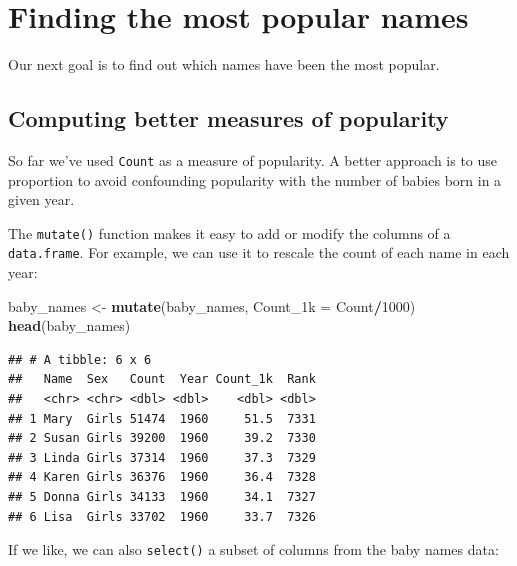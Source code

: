 \documentclass[]{book}
\newenvironment{Shaded}{\begin{snugshade}}{\end{snugshade}}
\newcommand{\DataTypeTok}[1]{\textcolor[rgb]{0.13,0.29,0.53}{#1}}
\newcommand{\DecValTok}[1]{\textcolor[rgb]{0.00,0.00,0.81}{#1}}
\newcommand{\KeywordTok}[1]{\textcolor[rgb]{0.13,0.29,0.53}{\textbf{#1}}}
\newcommand{\NormalTok}[1]{#1}
\newcommand{\OperatorTok}[1]{\textcolor[rgb]{0.81,0.36,0.00}{\textbf{#1}}}
\newcommand{\StringTok}[1]{\textcolor[rgb]{0.31,0.60,0.02}{#1}}
\begin{document}
\hypertarget{finding-the-most-popular-names}{%
\section{Finding the most popular names}\label{finding-the-most-popular-names}}

Our next goal is to find out which names have been the most popular.

\hypertarget{computing-better-measures-of-popularity}{%
\subsection{Computing better measures of popularity}\label{computing-better-measures-of-popularity}}

So far we've used \texttt{Count} as a measure of popularity. A better
approach is to use proportion to avoid confounding
popularity with the number of babies born in a given year.

The \texttt{mutate()} function makes it easy to add or modify the columns
of a \texttt{data.frame}. For example, we can use it to rescale the count
of each name in each year:

\begin{Shaded}
\begin{Highlighting}[]
\NormalTok{baby_names <-}\StringTok{ }\KeywordTok{mutate}\NormalTok{(baby_names, }\DataTypeTok{Count_1k =}\NormalTok{ Count}\OperatorTok{/}\DecValTok{1000}\NormalTok{)}
\KeywordTok{head}\NormalTok{(baby_names) }
\end{Highlighting}
\end{Shaded}

\begin{verbatim}
## # A tibble: 6 x 6
##   Name  Sex   Count  Year Count_1k  Rank
##   <chr> <chr> <dbl> <dbl>    <dbl> <dbl>
## 1 Mary  Girls 51474  1960     51.5  7331
## 2 Susan Girls 39200  1960     39.2  7330
## 3 Linda Girls 37314  1960     37.3  7329
## 4 Karen Girls 36376  1960     36.4  7328
## 5 Donna Girls 34133  1960     34.1  7327
## 6 Lisa  Girls 33702  1960     33.7  7326
\end{verbatim}

If we like, we can also \texttt{select()} a subset of columns from the baby names data:

\begin{Shaded}
\end{Shaded}
\end{document}
